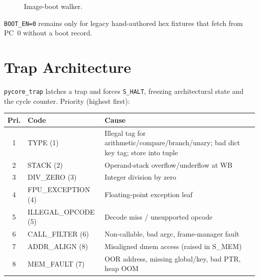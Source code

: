 \documentclass[11pt,a4paper]{article}
\newcommand{\modname}[1]{\texttt{#1}}
\begin{document}
\begin{figure}[htbp]
\centering
{}
\caption{Image-boot walker.}
\label{fig:boot}
\end{figure}

\texttt{BOOT\_EN=0} remains only for legacy hand-authored hex fixtures that
fetch from PC~0 without a boot record.

\section{Trap Architecture}
\label{sec:traps}

\modname{pycore\_trap} latches a trap and forces \texttt{S\_HALT}, freezing
architectural state and the cycle counter. Priority (highest first):

\begin{center}
\begin{tabular}{@{}clp{7.5cm}@{}}
\toprule
\textbf{Pri.} & \textbf{Code} & \textbf{Cause} \\
\midrule
1 & TYPE (1) & Illegal tag for arithmetic/compare/branch/unary; bad dict key tag; store into tuple \\
2 & STACK (2) & Operand-stack overflow/underflow at WB \\
3 & DIV\_ZERO (3) & Integer division by zero \\
4 & FPU\_EXCEPTION (4) & Floating-point exception leaf \\
5 & ILLEGAL\_OPCODE (5) & Decode miss / unsupported opcode \\
6 & CALL\_FILTER (6) & Non-callable, bad argc, frame-manager fault \\
7 & ADDR\_ALIGN (8) & Misaligned dmem access (raised in S\_MEM) \\
8 & MEM\_FAULT (7) & OOR address, missing global/key, bad PTR, heap OOM \\
\bottomrule
\end{tabular}
\end{center}
\end{document}
